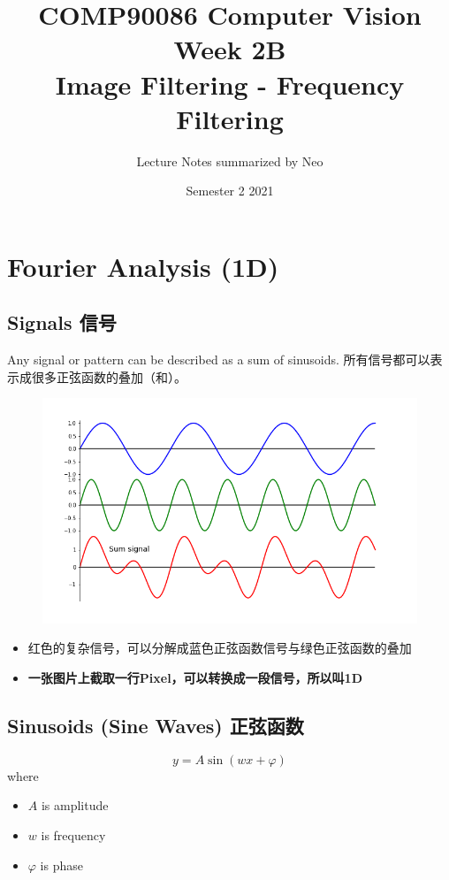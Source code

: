 \documentclass[11pt]{article}
\title{%
  \LARGE
  \textbf{COMP90086 Computer Vision \\
  \large Week 2B
  \\
  Image Filtering - Frequency Filtering}}
\author{ Lecture Notes summarized by Neo }
\date{Semester 2 2021}
\begin{document}
\maketitle


\section{Fourier Analysis (1D)}

\subsection{Signals 信号}
Any signal or pattern can be described as a sum of sinusoids.
所有信号都可以表示成很多正弦函数的叠加（和）。
\begin{figure}[bht!]
  \centering
  \includegraphics[width=\textwidth]{images/signals.png}
\end{figure}
\begin{itemize}
  \item 红色的复杂信号，可以分解成蓝色正弦函数信号与绿色正弦函数的叠加
  \item \textbf{一张图片上截取一行Pixel，可以转换成一段信号，所以叫1D}
\end{itemize}

\newpage
\subsection{Sinusoids (Sine Waves) 正弦函数}
$$y=A\sin (wx+\varphi )$$
where
\begin{itemize}
  \item $A$ is amplitude
  \item $w$ is frequency
  \item $\varphi$ is phase
\end{itemize}
\end{document}
